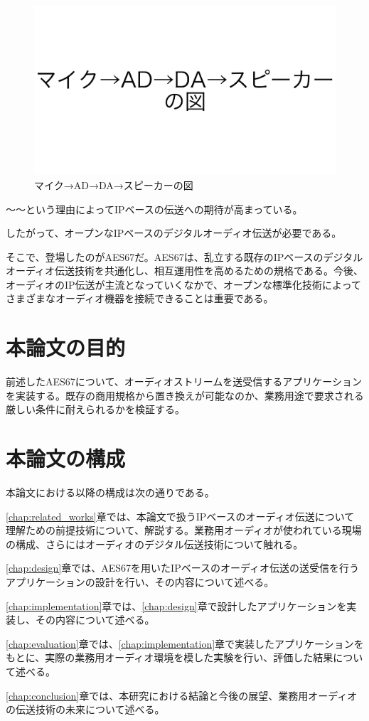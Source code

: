 \begin{figure}[htbp]
  \centering
  \label{fig:first_and_last_need_ad_da}
  \includegraphics[width=0.8\linewidth]{img/first_and_last_need_ad_da.pdf}
  \caption{マイク→AD→DA→スピーカーの図}
\end{figure}

〜〜という理由によってIPベースの伝送への期待が高まっている。

したがって、オープンなIPベースのデジタルオーディオ伝送が必要である。

そこで、登場したのがAES67だ。AES67は、乱立する既存のIPベースのデジタルオーディオ伝送技術を共通化し、相互運用性を高めるための規格である。今後、オーディオのIP伝送が主流となっていくなかで、オープンな標準化技術によってさまざまなオーディオ機器を接続できることは重要である。

\section{本論文の目的}

前述したAES67について、オーディオストリームを送受信するアプリケーションを実装する。既存の商用規格から置き換えが可能なのか、業務用途で要求される厳しい条件に耐えられるかを検証する。

\section{本論文の構成}

本論文における以降の構成は次の通りである。

\ref{chap:related_works}章では、本論文で扱うIPベースのオーディオ伝送について理解ための前提技術について、解説する。業務用オーディオが使われている現場の構成、さらにはオーディオのデジタル伝送技術について触れる。

\ref{chap:design}章では、AES67を用いたIPベースのオーディオ伝送の送受信を行うアプリケーションの設計を行い、その内容について述べる。

\ref{chap:implementation}章では、\ref{chap:design}章で設計したアプリケーションを実装し、その内容について述べる。

\ref{chap:evaluation}章では、\ref{chap:implementation}章で実装したアプリケーションをもとに、実際の業務用オーディオ環境を模した実験を行い、評価した結果について述べる。

\ref{chap:conclusion}章では、本研究における結論と今後の展望、業務用オーディオの伝送技術の未来について述べる。
